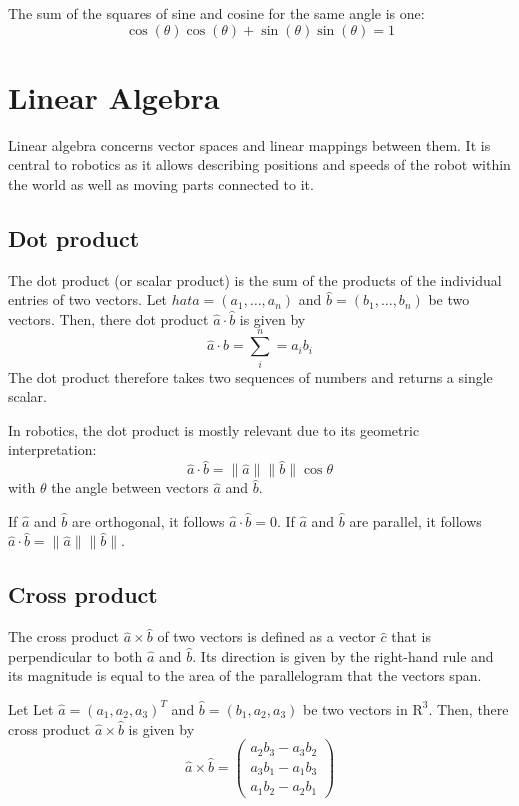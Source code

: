 \documentclass[paper=6.14in:9.21in,pagesize=pdftex,11pt,twoside,openright]{scrbook}
\begin{document}
The sum of the squares of sine and cosine for the same angle is one:
\begin{equation}
\cos(\theta)\cos(\theta)+\sin(\theta)\sin(\theta)=1
\end{equation}

\chapter{Linear Algebra}
Linear algebra concerns vector spaces and linear mappings between them. It is central to robotics as it allows describing positions and speeds of the robot within the world as well as moving parts connected to it.

\section{Dot product}
The dot product (or scalar product) is the sum of the products of the individual entries of two vectors. Let $hat{a}=(a_1,\ldots,a_n)$ and $\hat{b}=(b_1,\ldots,b_n)$ be two vectors. Then, there dot product $\hat{a}\cdot\hat{b}$ is given by
\begin{equation}
\hat{a}\cdot\hat{b}=\sum_{i}^n=a_ib_i
\end{equation}
The dot product therefore takes two sequences of numbers and returns a single scalar.

In robotics, the dot product is mostly relevant due to its geometric interpretation:
\begin{equation}
\hat{a}\cdot\hat{b}=\|\hat{a}\|\|\hat{b}\|\cos\theta
\end{equation}
with $\theta$ the angle between vectors $\hat{a}$ and $\hat{b}$.

If $\hat{a}$ and $\hat{b}$ are orthogonal, it follows $\hat{a}\cdot\hat{b}=0$. If $\hat{a}$ and $\hat{b}$ are parallel, it follows $\hat{a}\cdot\hat{b}=\|\hat{a}\|\|\hat{b}\|$.

\section{Cross product}
The cross product $\hat{a} \times \hat{b}$ of two vectors is defined as a vector $\hat{c}$ that is perpendicular to both $\hat{a}$ and $\hat{b}$. Its direction is given by the right-hand rule and its magnitude is equal to the area of the parallelogram that the vectors span.

Let Let $\hat{a}=(a_1,a_2,a_3)^T$ and $\hat{b}=(b_1,a_2,a_3)$ be two vectors in $\mathrm{R}^3$. Then, there cross product $\hat{a}\times\hat{b}$ is given by
\begin{equation}
\hat{a}\times\hat{b}=\left(
\begin{array}{l}
a_2b_3-a_3b_2\\
a_3b_1-a_1b_3\\
a_1b_2-a_2b_1
\end{array}
\right)
\end{equation}
\end{document}
